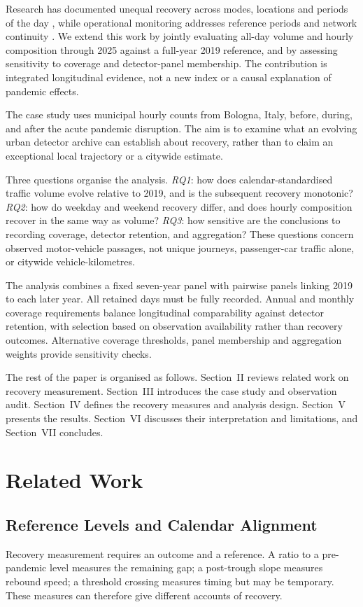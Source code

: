 \documentclass[]{interact}
\begin{document}
Research has documented unequal recovery across modes, locations and periods of the day \cite{gao2024,li2023,zheng2024}, while operational monitoring addresses reference periods and network continuity \cite{dft,cambridge2024}. We extend this work by jointly evaluating all-day volume and hourly composition through 2025 against a full-year 2019 reference, and by assessing sensitivity to coverage and detector-panel membership. The contribution is integrated longitudinal evidence, not a new index or a causal explanation of pandemic effects.

The case study uses municipal hourly counts from Bologna, Italy, before, during, and after the acute pandemic disruption. The aim is to examine what an evolving urban detector archive can establish about recovery, rather than to claim an exceptional local trajectory or a citywide estimate.

Three questions organise the analysis. \emph{RQ1}: how does calendar-standardised traffic volume evolve relative to 2019, and is the subsequent recovery monotonic? \emph{RQ2}: how do weekday and weekend recovery differ, and does hourly composition recover in the same way as volume? \emph{RQ3}: how sensitive are the conclusions to recording coverage, detector retention, and aggregation? These questions concern observed motor-vehicle passages, not unique journeys, passenger-car traffic alone, or citywide vehicle-kilometres.

The analysis combines a fixed seven-year panel with pairwise panels linking 2019 to each later year. All retained days must be fully recorded. Annual and monthly coverage requirements balance longitudinal comparability against detector retention, with selection based on observation availability rather than recovery outcomes. Alternative coverage thresholds, panel membership and aggregation weights provide sensitivity checks.

The rest of the paper is organised as follows. Section~II reviews related work on recovery measurement. Section~III introduces the case study and observation audit. Section~IV defines the recovery measures and analysis design. Section~V presents the results. Section~VI discusses their interpretation and limitations, and Section~VII concludes.

\section{Related Work}
\subsection{Reference Levels and Calendar Alignment}
Recovery measurement requires an outcome and a reference. A ratio to a pre-pandemic level measures the remaining gap; a post-trough slope measures rebound speed; a threshold crossing measures timing but may be temporary. These measures can therefore give different accounts of recovery.
\end{document}

